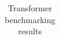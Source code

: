 \begin{table}
\caption{Transformer benchmarking results}
\label{tab:benchmarks}
\begin{tabular}{}
\toprule
\midrule
\bottomrule
\end{tabular}
\end{table}
